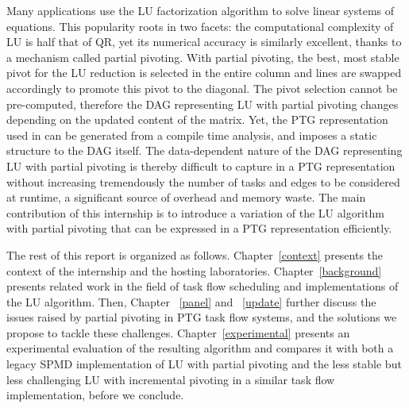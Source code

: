 
Many applications use the LU factorization algorithm to solve
linear systems of equations. This popularity roots in two facets: the
computational complexity of LU is half that of QR, yet its numerical
accuracy is similarly excellent, thanks to a mechanism called partial
pivoting. With partial pivoting, the best, most stable pivot for the LU
reduction is selected in the entire column and lines are swapped
accordingly to promote this pivot to the diagonal. The pivot
selection cannot be pre-computed, therefore
the DAG representing LU with partial pivoting changes depending on the
updated content of the matrix. Yet, the PTG representation used in
\dague can be generated from a compile time analysis, and imposes a static
structure to the DAG itself. The data-dependent nature of the DAG
representing LU with partial pivoting is thereby difficult to capture in
a PTG representation without increasing tremendously the number of tasks
and edges to be considered at runtime, a significant source of overhead
and memory waste. The main contribution of this internship is to introduce a
variation of the LU algorithm with partial pivoting that can be
expressed in a PTG representation efficiently.



The rest of this report is organized as follows. Chapter~\ref{context} presents the context of the internship and the hosting laboratories. Chapter~\ref{background}
presents related work in the field of task flow scheduling and
implementations of the LU algorithm. Then, Chapter ~\ref{panel} and ~\ref{update} further
discuss the issues raised by partial pivoting in PTG task flow systems, and
the solutions we propose to tackle these challenges.
Chapter~\ref{experimental} presents an experimental evaluation of the
resulting algorithm and compares it with both a legacy SPMD
implementation of LU with partial pivoting and the less stable but less
challenging LU with incremental pivoting in a similar task flow
implementation, before we conclude.
